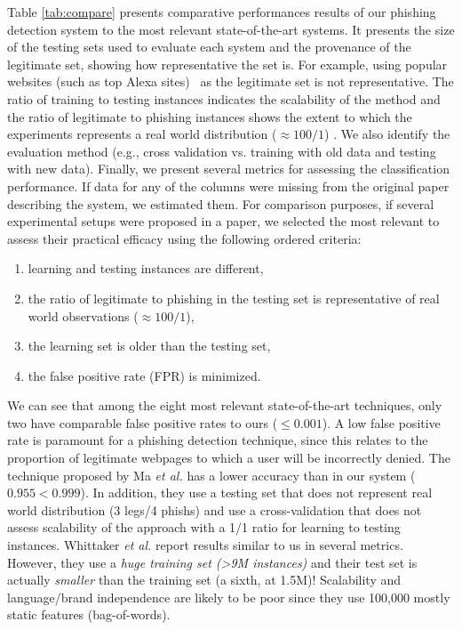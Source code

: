 \documentclass[10pt,conference,compsocconf,letterpaper]{IEEEtran}
\begin{document}
Table \ref{tab:compare} presents comparative performances results of our phishing detection system to the most relevant state-of-the-art systems. It presents the size of the testing sets used to evaluate each system and the provenance of the legitimate set, showing how representative the set is. For example, using popular websites (such as top Alexa sites)~\cite{Chen:2014:anti,ramesh:2014:efficious} as the legitimate set is not representative. The ratio of training to testing instances indicates the scalability of the method and the ratio of legitimate to phishing instances shows the extent to which the experiments represents a real world distribution ($ \approx 100/1$) \cite{whittaker:2010:large,zhang:2007:cantina}. We also identify the evaluation method (e.g., cross validation vs. training with old data and testing with new data). Finally, we present several metrics for assessing the classification performance. If data for any of the columns were missing from the original paper describing the system, we estimated them.
For comparison purposes, if several experimental setups were proposed in a paper, we selected the most relevant to assess their practical efficacy using the following ordered criteria:

\begin{enumerate}[topsep=0pt,itemsep=-1ex,partopsep=0pt,parsep=1ex]
\item learning and testing instances are different,
 \item the ratio of legitimate to phishing in the testing set is representative of real world observations ($ \approx 100/1$),
 \item the learning set is older than the testing set,
 \item the false positive rate (FPR) is minimized.
\end{enumerate}

We can see that among the eight most relevant state-of-the-art techniques, only two \cite{Ma:2009:beyond,whittaker:2010:large} have comparable false positive rates to ours ($\leq 0.001$). A low false positive rate is paramount for a phishing detection technique, since this relates to the proportion of legitimate webpages to which a user will be incorrectly denied.
The technique proposed by Ma \textit{et al.} \cite{Ma:2009:beyond} has a lower accuracy than in our system ($0.955<0.999$). In addition, they use a testing set that does not represent real world distribution (3 legs/4 phishs) and use a cross-validation that does not assess scalability of the approach with a 1/1 ratio for learning to testing instances. 
Whittaker \textit{et al.} \cite{whittaker:2010:large} report results similar to us in several metrics. However, they use a \emph{huge training set (\textgreater 9M instances)} and their test set is actually \emph{smaller} than the training set (a sixth, at 1.5M)! Scalability and language/brand independence are likely to be poor since they use 100,000 mostly static features (bag-of-words).
\end{document}
